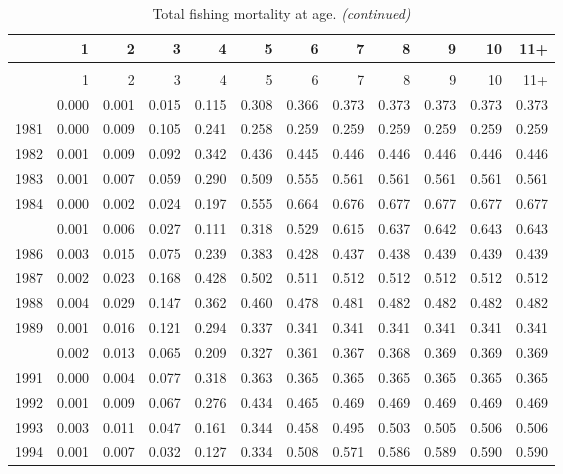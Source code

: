 \documentclass[
]{article}
\begin{document}
\begin{longtable}[t]{lrrrrrrrrrrr}
\caption{\label{tab:FAA-tot-table}Total fishing mortality at age.}\\
\toprule
  & 1 & 2 & 3 & 4 & 5 & 6 & 7 & 8 & 9 & 10 & 11+\\
\midrule
\endfirsthead
\caption[]{Total fishing mortality at age. \textit{(continued)}}\\
\toprule
  & 1 & 2 & 3 & 4 & 5 & 6 & 7 & 8 & 9 & 10 & 11+\\
\midrule
\endhead

\endfoot
\bottomrule
\endlastfoot
1980 & 0.000 & 0.001 & 0.015 & 0.115 & 0.308 & 0.366 & 0.373 & 0.373 & 0.373 & 0.373 & 0.373\\
1981 & 0.000 & 0.009 & 0.105 & 0.241 & 0.258 & 0.259 & 0.259 & 0.259 & 0.259 & 0.259 & 0.259\\
1982 & 0.001 & 0.009 & 0.092 & 0.342 & 0.436 & 0.445 & 0.446 & 0.446 & 0.446 & 0.446 & 0.446\\
1983 & 0.001 & 0.007 & 0.059 & 0.290 & 0.509 & 0.555 & 0.561 & 0.561 & 0.561 & 0.561 & 0.561\\
1984 & 0.000 & 0.002 & 0.024 & 0.197 & 0.555 & 0.664 & 0.676 & 0.677 & 0.677 & 0.677 & 0.677\\
\addlinespace
1985 & 0.001 & 0.006 & 0.027 & 0.111 & 0.318 & 0.529 & 0.615 & 0.637 & 0.642 & 0.643 & 0.643\\
1986 & 0.003 & 0.015 & 0.075 & 0.239 & 0.383 & 0.428 & 0.437 & 0.438 & 0.439 & 0.439 & 0.439\\
1987 & 0.002 & 0.023 & 0.168 & 0.428 & 0.502 & 0.511 & 0.512 & 0.512 & 0.512 & 0.512 & 0.512\\
1988 & 0.004 & 0.029 & 0.147 & 0.362 & 0.460 & 0.478 & 0.481 & 0.482 & 0.482 & 0.482 & 0.482\\
1989 & 0.001 & 0.016 & 0.121 & 0.294 & 0.337 & 0.341 & 0.341 & 0.341 & 0.341 & 0.341 & 0.341\\
\addlinespace
1990 & 0.002 & 0.013 & 0.065 & 0.209 & 0.327 & 0.361 & 0.367 & 0.368 & 0.369 & 0.369 & 0.369\\
1991 & 0.000 & 0.004 & 0.077 & 0.318 & 0.363 & 0.365 & 0.365 & 0.365 & 0.365 & 0.365 & 0.365\\
1992 & 0.001 & 0.009 & 0.067 & 0.276 & 0.434 & 0.465 & 0.469 & 0.469 & 0.469 & 0.469 & 0.469\\
1993 & 0.003 & 0.011 & 0.047 & 0.161 & 0.344 & 0.458 & 0.495 & 0.503 & 0.505 & 0.506 & 0.506\\
1994 & 0.001 & 0.007 & 0.032 & 0.127 & 0.334 & 0.508 & 0.571 & 0.586 & 0.589 & 0.590 & 0.590\\

\end{longtable}
\end{document}
